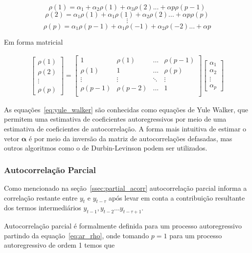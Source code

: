 $$\rho(1) = \alpha_{1} + \alpha_{2}\rho(1) + \alpha_{3}\rho(2) ... + \alpha{p}\rho(p-1)$$
$$\rho(2) = \alpha_{1}\rho(1) + \alpha_{1}\rho(1) + \alpha_{2}\rho(2) ... + \alpha{p}\rho(p)$$
$$\vdots$$
$$\rho(p) = \alpha_{1}\rho(p-1) + \alpha_{1}\rho(-1) + \alpha_{2}\rho(-2) ... + \alpha{p}$$

Em forma matricial

\begin{gather}\label{eq:yule_walker}
  \begin{bmatrix} \rho(1) \\ \rho(2) \\ \vdots \\ \rho(p) \end{bmatrix}
  =
  \begin{bmatrix}
      1 & \rho(1) & ... & \rho(p-1) \\
      \rho(1) & 1 & ... & \rho(p) \\
      \vdots & \vdots & \ddots & \vdots \\
      \rho(p-1) & \rho(p-2) & ... & 1 \\
  \end{bmatrix}
  \begin{bmatrix} \alpha_{1} \\ \alpha_{2} \\ \vdots \\ \alpha_{p} \end{bmatrix}
\end{gather}

As equações~\ref{eq:yule_walker} são conhecidas como equações de Yule Walker,
que permitem uma estimativa de coeficientes autoregressivos por meio de uma
estimativa de coeficientes de autocorrelação. A forma mais intuitiva de estimar
o vetor $\mathbf{\alpha}$ é por meio da inversão da matriz de autocorrelações
defasadas, mas outros algoritmos como o de Durbin-Levinson podem ser utilizados.

\subsubsection{Autocorrelação Parcial}

Como mencionado na seção~\ref{ssec:partial_acorr} autocorrelação parcial
informa a correlação restante entre $y_t$ e $y_{t-\tau}$ após levar em
conta a contribuição resultante dos termos intermediários $y_{t-1}, y_{t-2}
... y_{t-\tau+1}$.

Autocorrelação parcial é formalmente definida para um processo autoregressivo
partindo da equação~\ref{eq:ar_rho}, onde tomando $p=1$ para um processo
autoregressivo de ordem 1 temos que

